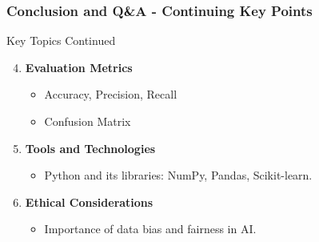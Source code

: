 \documentclass[aspectratio=169]{beamer}
\begin{document}
\begin{frame}[fragile]
    \frametitle{Conclusion and Q\&A - Continuing Key Points}
    \begin{block}{Key Topics Continued}
        \begin{enumerate}
            \setcounter{enumi}{3} %
            \item \textbf{Evaluation Metrics}
            \begin{itemize}
                \item Accuracy, Precision, Recall
                \item Confusion Matrix
            \end{itemize}

            \item \textbf{Tools and Technologies}
            \begin{itemize}
                \item Python and its libraries: NumPy, Pandas, Scikit-learn.
            \end{itemize}

            \item \textbf{Ethical Considerations}
            \begin{itemize}
                \item Importance of data bias and fairness in AI.
            \end{itemize}
        \end{enumerate}
    \end{block}
\end{frame}
\end{document}
